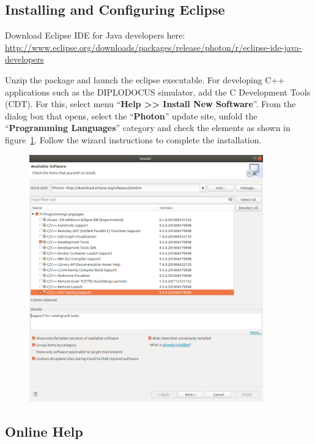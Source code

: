 \documentclass[12pt]{article}
\begin{document}
\subsection{Installing and Configuring Eclipse}

Download Eclipse IDE for Java developers here: \\
\url{http://www.eclipse.org/downloads/packages/release/photon/r/eclipse-ide-java-developers}

Unzip the package and launch the eclipse executable. For developing C++
applications such as the DIPLODOCUS simulator, add the C Development Tools
(CDT). For this, select menu ``\textbf{Help >> Install New Software}''.
From the dialog box that opens, select the ``\textbf{Photon}'' update site, unfold the
``\textbf{Programming Languages}'' category and check the elements as shown in
figure~\ref{fig:image2}. Follow the wizard instructions to complete the
installation.

\begin{figure}[H]
\begin{center}
\includegraphics[width=0.9\textwidth, height=0.5\textheight]{images/image3.png}
\caption{}
\label{fig:image2}
\end{center}
\end{figure}

\subsection{Online Help}
\end{document}

